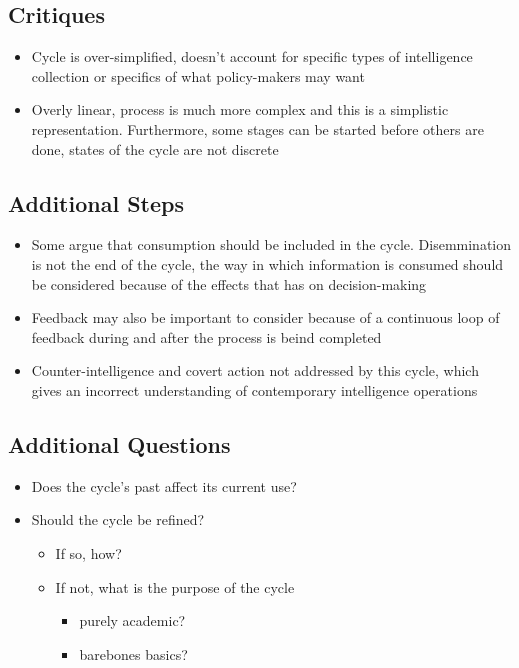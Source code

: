 \documentclass[11pt]{article}
\begin{document}
\subsection{Critiques}
\label{sec:orge27bc10}
\begin{itemize}
\item Cycle is over-simplified, doesn't account for specific types of intelligence collection or specifics of what policy-makers may want
\item Overly linear, process is much more complex and this is a simplistic representation. Furthermore, some stages can be started before others are done, states of the cycle are not discrete
\end{itemize}
\subsection{Additional Steps}
\label{sec:orgf1a763b}
\begin{itemize}
\item Some argue that consumption should be included in the cycle. Disemmination is not the end of the cycle, the way in which information is consumed should be considered because of the effects that has on decision-making
\item Feedback may also be important to consider because of a continuous loop of feedback during and after the process is beind completed
\item Counter-intelligence and covert action not addressed by this cycle, which gives an incorrect understanding of contemporary intelligence operations
\end{itemize}
\subsection{Additional Questions}
\label{sec:org652f545}
\begin{itemize}
\item Does the cycle's past affect its current use?
\item Should the cycle be refined?
\begin{itemize}
\item If so, how?
\item If not, what is the purpose of the cycle
\begin{itemize}
\item purely academic?
\item barebones basics?
\end{itemize}
\end{itemize}
\end{itemize}
\end{document}
